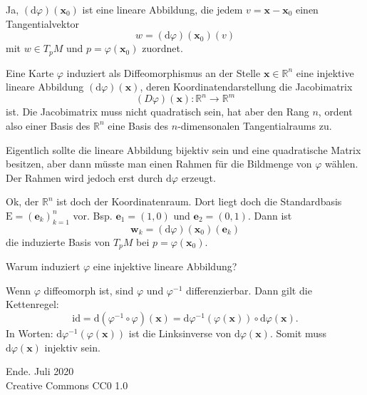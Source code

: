 \documentclass[9pt]{beamer}
\newcommand{\modest}[1]{{\small\color{gray}#1}}
\newcommand{\R}{\mathbb R}
\begin{document}
\begin{frame}
Ja, $(\mathrm d\varphi)(\mathbf x_0)$ ist eine lineare Abbildung,
die jedem $v=\mathbf x-\mathbf x_0$ einen Tangentialvektor
\[w = (\mathrm d\varphi)(\mathbf x_0)(v)\]
mit $w\in T_pM$ und $p=\varphi(\mathbf x_0)$ zuordnet.
\end{frame}

\begin{frame}
Eine Karte $\varphi$ induziert als Diffeomorphismus an der Stelle
$\mathbf x\in\R^n$ eine injektive lineare
Abbildung $(\mathrm d\varphi)(\mathbf x)$, deren Koordinatendarstellung die
Jacobimatrix
\[(D\varphi)(\mathbf x)\colon\R^n\to\R^m\]
ist.
Die Jacobimatrix muss nicht quadratisch sein, hat aber den Rang $n$,
ordent also einer Basis des $\R^n$ eine Basis des $n$-dimensonalen
Tangentialraums zu.
\end{frame}

\begin{frame}
Eigentlich sollte die lineare Abbildung bijektiv sein und eine quadratische
Matrix besitzen, aber dann müsste
man einen Rahmen für die Bildmenge von $\varphi$ wählen. Der Rahmen
wird jedoch erst durch $\mathrm d\varphi$ erzeugt.
\end{frame}

\begin{frame}
Ok, der $\R^n$ ist doch der Koordinatenraum. Dort liegt doch die
Standardbasis $\mathrm E=(\mathbf e_k)_{k=1}^n$ vor. Bsp.
$\mathbf e_1=(1,0)$ und $\mathbf e_2=(0,1)$. Dann ist
\[\mathbf w_k = (\mathrm d\varphi)(\mathbf x_0)(\mathbf e_k)\]
die induzierte Basis von $T_pM$ bei $p=\varphi(\mathbf x_0)$.
\end{frame}

\begin{frame}
Warum induziert $\varphi$ eine injektive lineare Abbildung?
\end{frame}

\begin{frame}
Wenn $\varphi$ diffeomorph ist, sind $\varphi$ und $\varphi^{-1}$
differenzierbar. Dann gilt die Kettenregel:
\[\mathrm{id} = \mathrm d(\varphi^{-1}\circ\varphi)(\mathbf x)
= \mathrm d\varphi^{-1}(\varphi(\mathbf x))\circ\mathrm d\varphi(\mathbf x).\]
In Worten: $\mathrm d\varphi^{-1}(\varphi(\mathbf x))$ ist die
Linksinverse von $\mathrm d\varphi(\mathbf x)$. Somit muss
$\mathrm d\varphi(\mathbf x)$ injektiv sein.
\end{frame}

\begin{frame}
Ende.
\vfill\hfill\modest{Juli 2020}\\
\hfill\modest{Creative Commons CC0 1.0}
\end{frame}
\end{document}
